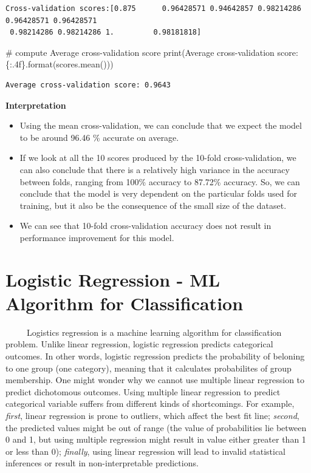 \documentclass[
  letterpaper,
  DIV=11,
  numbers=noendperiod]{scrreprt}
\newenvironment{Shaded}{\begin{snugshade}}{\end{snugshade}}
\newcommand{\BuiltInTok}[1]{\textcolor[rgb]{0.00,0.23,0.31}{#1}}
\newcommand{\CommentTok}[1]{\textcolor[rgb]{0.37,0.37,0.37}{#1}}
\newcommand{\NormalTok}[1]{\textcolor[rgb]{0.00,0.23,0.31}{#1}}
\newcommand{\SpecialCharTok}[1]{\textcolor[rgb]{0.37,0.37,0.37}{#1}}
\newcommand{\StringTok}[1]{\textcolor[rgb]{0.13,0.47,0.30}{#1}}
\begin{document}
\begin{verbatim}
Cross-validation scores:[0.875      0.96428571 0.94642857 0.98214286 0.96428571 0.96428571
 0.98214286 0.98214286 1.         0.98181818]
\end{verbatim}

\begin{Shaded}
\begin{Highlighting}[]
\CommentTok{\# compute Average cross{-}validation score}
\BuiltInTok{print}\NormalTok{(}\StringTok{\textquotesingle{}Average cross{-}validation score: }\SpecialCharTok{\{:.4f\}}\StringTok{\textquotesingle{}}\NormalTok{.}\BuiltInTok{format}\NormalTok{(scores.mean()))}
\end{Highlighting}
\end{Shaded}

\begin{verbatim}
Average cross-validation score: 0.9643
\end{verbatim}

\textbf{Interpretation}

\begin{itemize}
\item
  Using the mean cross-validation, we can conclude that we expect the
  model to be around 96.46 \% accurate on average.
\item
  If we look at all the 10 scores produced by the 10-fold
  cross-validation, we can also conclude that there is a relatively high
  variance in the accuracy between folds, ranging from 100\% accuracy to
  87.72\% accuracy. So, we can conclude that the model is very dependent
  on the particular folds used for training, but it also be the
  consequence of the small size of the dataset.
\item
  We can see that 10-fold cross-validation accuracy does not result in
  performance improvement for this model.
\end{itemize}

\section{Logistic Regression - ML Algorithm for
Classification}\label{logistic-regression---ml-algorithm-for-classification}

~~~~~Logistics regression is a machine learning algorithm for
classification problem. Unlike linear regression, logistic regression
predicts categorical outcomes. In other words, logistic regression
predicts the probability of beloning to one group (one category),
meaning that it calculates probabilites of group membership. One might
wonder why we cannot use multiple linear regression to predict
dichotomous outcomes. Using multiple linear regression to predict
categorical variable suffers from different kinds of shortcomings. For
example, \emph{first}, linear regression is prone to outliers, which
affect the best fit line; \emph{second}, the predicted values might be
out of range (the value of probabilities lie between 0 and 1, but using
multiple regression might result in value either greater than 1 or less
than 0); \emph{finally}, using linear regression will lead to invalid
statistical inferences or result in non-interpretable predictions.
\end{document}
